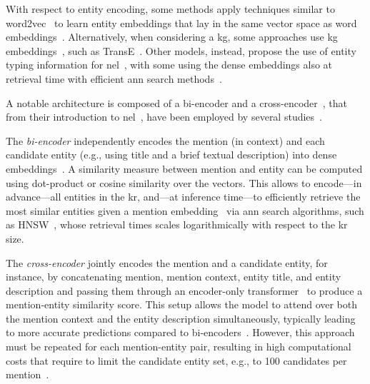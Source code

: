 With respect to entity encoding, some methods apply techniques similar to word2vec~\cite{mikolov2013} to learn entity embeddings that lay in the same vector space as word embeddings~\cite{moreno_combining_word_entity_embeddings_2017,yamada-etal-2017-learning}. Alternatively, when considering a \ac{kg}, some approaches use \acl{kg} embeddings~\cite{pnel_pointer_network_based_end_to_end_entity_linking_2020,sorokin-gurevych-2018-mixing}, such as TransE~\cite{transe_2013}.
Other models, instead, propose the use of entity typing information for \ac{nel}~\cite{gupta-etal-2017-entity,khalife-vazirgiannis-2019-scalable,Raiman_Raiman_2018,Onoe_Durrett_2020,Heist2023nastylinker}, with some using the dense embeddings also at retrieval time with efficient \acf{ann} search methods~\cite{gillick-etal-2019-learning,blink}.


A notable architecture is composed of a bi-encoder and a cross-encoder~\cite{Humeau2020Poly-encoders}, that from their introduction to \acl{nel}~\cite{gillick-etal-2019-learning,logeswaran-etal-2019-zero,blink}, have been employed by several studies~\cite{kassner-etal-2022-edin,Heist2023nastylinker,bhargav-etal-2022-zero,dong_reveal_the_unknown_2023}.

The \emph{bi-encoder} independently encodes the mention (in context) and each candidate entity (e.g., using title and a brief textual description) into dense embeddings~\cite{blink,Humeau2020Poly-encoders}. A similarity measure between mention and entity can be computed using dot-product or cosine similarity over the vectors.
This allows to encode---in advance---all entities in the \ac{kr}, and---at inference time---to efficiently retrieve the most similar entities given a mention embedding~\cite{blink} via \ac{ann} search algorithms, such as HNSW~\cite{hnsw_2020}, whose retrieval times scales logarithmically with respect to the \ac{kr} size.

The \emph{cross-encoder} jointly encodes the mention and a candidate entity, for instance, by concatenating mention, mention context, entity title, and entity description and passing them through an encoder-only transformer~\cite{blink,logeswaran-etal-2019-zero} to produce a mention-entity similarity score. This setup allows the model to attend over both the mention context and the entity description simultaneously, typically leading to more accurate predictions compared to bi-encoders~\cite{blink}. However, this approach must be repeated for each mention-entity pair, resulting in high computational costs that require to limit the candidate entity set, e.g., to 100 candidates per mention~\cite{blink}. 

